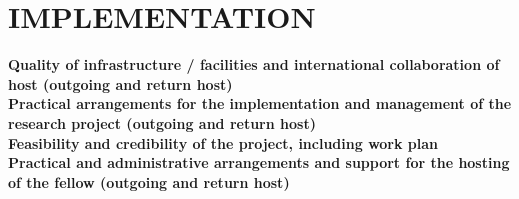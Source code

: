 \section{IMPLEMENTATION} %
\label{sec:implementation}
\textbf{Quality of infrastructure / facilities and international collaboration of host (outgoing and 
return host)} \\
\textbf{Practical arrangements for the implementation and management of the research project 
(outgoing and return host)} \\
\textbf{Feasibility and credibility of the project, including work plan} \\
\textbf{Practical and administrative arrangements and support for the hosting of the fellow 
(outgoing and return host)} \\
\newpage
